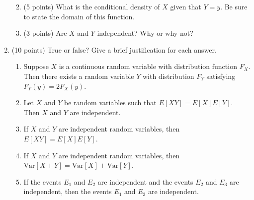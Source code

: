\documentclass[11pt]{article}
\theoremstyle{plain}
\newcommand{\Var}{\ensuremath{\textrm{Var}}}
\begin{document}
\begin{enumerate}
\begin{enumerate}
        \vfill

        \item (5 points)
        What is the conditional density of $X$ given that $Y = y$.
        Be sure to state the domain of this function.

        \vfill

        \item (3 points)
        Are $X$ and $Y$ independent? Why or why not?
        \vfill
    \end{enumerate}

    \newpage

    \item (10 points)
    True or false?
    Give a brief justification for each answer.

    \begin{enumerate}
        \item Suppose $X$ is a continuous random variable with distribution function $F_X$. 
        Then there exists a random variable $Y$ with distribution $F_Y$ satisfying $F_Y(y) = 2F_X(y)$.

        \vfill

        \item Let $X$ and $Y$ be random variables such that $E[XY] = E[X]E[Y]$.
        Then $X$ and $Y$ are independent.

        \vfill

        \item If $X$ and $Y$ are independent random variables, then $E[XY] = E[X]E[Y]$.

        \vfill

        \item If $X$ and $Y$ are independent random variables, then $\Var[X+Y] = \Var[X] + \Var[Y]$.
        \vfill

        \item If the events $E_1$ and $E_2$ are independent and the events $E_2$ and $E_3$ are independent, then the events $E_1$ and $E_3$ are independent.

        \vfill
    \end{enumerate}

\end{enumerate}
\end{document}
